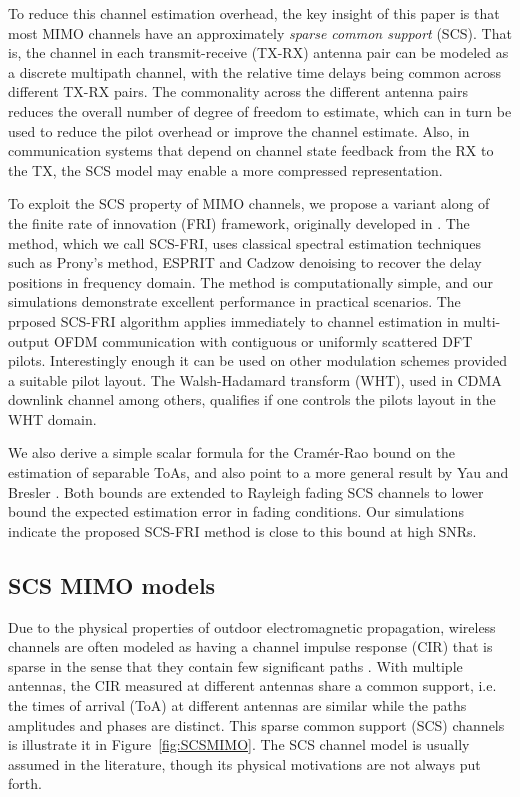 \documentclass[journal,10pt]{IEEEtran}
\begin{document}
To reduce this channel estimation overhead, the key insight of this paper is
that most MIMO channels have an approximately \emph{sparse common support} (SCS).
That is, the channel in each transmit-receive (TX-RX) antenna pair can be modeled as a discrete
multipath channel, with the relative time delays being common across different TX-RX pairs.
The commonality across the different antenna pairs reduces the overall number of degree
of freedom to estimate, which can in turn be used to reduce the pilot overhead or
improve the channel estimate.  Also, in communication systems that depend on channel state
feedback from the RX to the TX, the SCS model may enable a more compressed representation.

To exploit the SCS property of MIMO channels, we propose a variant along \cite{barbotin2011a,theLetterPaper} of the
finite rate of innovation (FRI) framework, originally developed in \cite{Blu2008}.
The method, which we call SCS-FRI, uses
classical spectral estimation techniques such as Prony's method, ESPRIT and Cadzow denoising
to recover the delay positions in frequency domain.  The method is computationally simple,
and our simulations demonstrate excellent performance in practical scenarios.
The prposed SCS-FRI algorithm applies immediately to channel estimation in multi-output OFDM communication with contiguous or uniformly scattered DFT pilots. Interestingly enough it can be used on other modulation schemes provided a suitable pilot layout. The Walsh-Hadamard transform (WHT), used in CDMA downlink channel among others, qualifies if one controls the pilots layout in the WHT domain.

We also derive a simple scalar formula for the Cram\'er-Rao bound on the estimation of separable ToAs,
and also point to a more general result by Yau and Bresler \cite{Yau1992}. Both bounds are extended to Rayleigh fading SCS channels to lower bound the expected estimation error in fading conditions.
Our simulations indicate the proposed SCS-FRI method is close to this bound at high SNRs.




\subsection{SCS MIMO models}

Due to the physical properties of outdoor electromagnetic propagation, wireless channels are often
modeled as having a channel impulse response (CIR) that is
sparse in the sense that they contain few significant paths \cite{Rappaport2002}.
With multiple antennas, the CIR measured at different antennas share a common support, i.e. the times of arrival (ToA) at different antennas are similar while the paths amplitudes and phases
are distinct. This sparse common support (SCS) channels is illustrate it in Figure~\ref{fig:SCSMIMO}. The SCS channel model is usually assumed in the literature, though its physical motivations are not always put forth.
\end{document}
